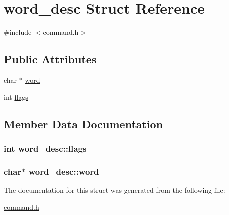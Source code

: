 \hypertarget{structword__desc}{}\section{word\+\_\+desc Struct Reference}
\label{structword__desc}


{\ttfamily \#include $<$command.\+h$>$}

\subsection*{Public Attributes}
\begin{DoxyCompactItemize}
\item 
char $\ast$ \hyperlink{structword__desc_a7fe36c900b18a60a1aeffadf9ae1c01f}{word}
\item 
int \hyperlink{structword__desc_aaf191cb3477717d8b7479fda976063dd}{flags}
\end{DoxyCompactItemize}


\subsection{Member Data Documentation}
\subsubsection[{\texorpdfstring{flags}{flags}}]{\setlength{\rightskip}{0pt plus 5cm}int word\+\_\+desc\+::flags}\hypertarget{structword__desc_aaf191cb3477717d8b7479fda976063dd}{}\label{structword__desc_aaf191cb3477717d8b7479fda976063dd}
\subsubsection[{\texorpdfstring{word}{word}}]{\setlength{\rightskip}{0pt plus 5cm}char$\ast$ word\+\_\+desc\+::word}\hypertarget{structword__desc_a7fe36c900b18a60a1aeffadf9ae1c01f}{}\label{structword__desc_a7fe36c900b18a60a1aeffadf9ae1c01f}


The documentation for this struct was generated from the following file\+:\begin{DoxyCompactItemize}
\item 
\hyperlink{command_8h}{command.\+h}\end{DoxyCompactItemize}
